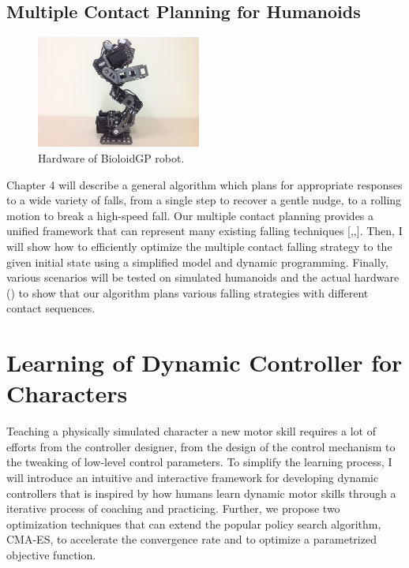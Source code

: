 \subsection{Multiple Contact Planning for Humanoids}
\begin{figure}
 \vspace{-25pt}
  \begin{center}
    \includegraphics[width=0.48\textwidth]{images/intro_hardware.jpg}
  \end{center}
   \vspace{-25pt}
  \caption{Hardware of BioloidGP robot.}
   \vspace{-10pt}
  \label{fig:intro_hardware}
\end{figure}
Chapter 4 will describe a general algorithm which plans for appropriate 
responses to a wide variety of falls, from a single step to recover a gentle nudge, to a rolling motion to break a high-speed fall.
Our multiple contact planning provides a unified framework
that can represent many existing falling techniques [,,].
Then, I will show how to efficiently optimize the multiple contact falling
strategy to the given initial state using a simplified model and dynamic 
programming.
Finally, various scenarios will be tested on simulated humanoids and the
actual hardware () to show that our algorithm plans
various falling strategies with different contact sequences.

\section{Learning of Dynamic Controller for Characters}
Teaching a physically simulated character a new motor skill requires 
a lot of efforts from the controller designer, from the design of the control 
mechanism to the tweaking of low-level control parameters.
To simplify the learning process, I will introduce an intuitive and 
interactive framework for developing dynamic controllers that is inspired by
how humans learn dynamic motor skills through a iterative process of coaching
and practicing.
Further, we propose two optimization techniques that can extend the popular
policy search algorithm, CMA-ES, to accelerate the convergence rate
and to optimize a parametrized objective function.

